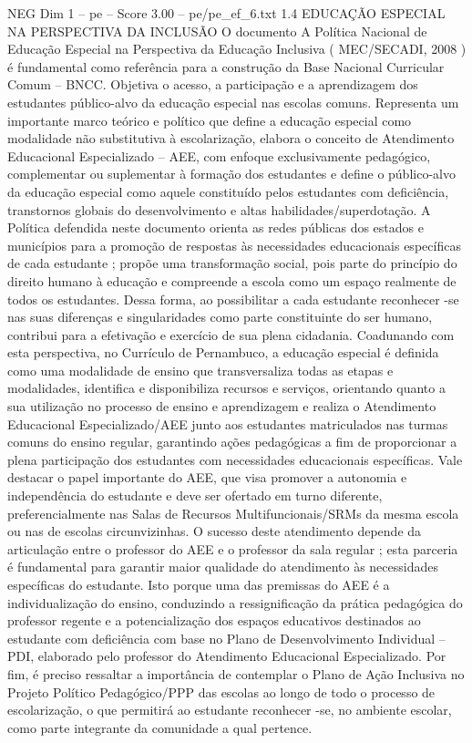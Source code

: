 \begin{textsample}{NEG Dim 1 – pe – Score 3.00 – pe/pe\_ef\_6.txt}  \label{ex:f1_neg_050}
1.4 EDUCAÇÃO ESPECIAL NA PERSPECTIVA DA INCLUSÃO O documento A Política Nacional de Educação Especial na Perspectiva da Educação Inclusiva ( MEC/SECADI, 2008 ) é fundamental como referência para a construção da Base Nacional Curricular Comum – BNCC.
Objetiva o acesso, a participação e a aprendizagem dos estudantes público-alvo da educação especial nas escolas comuns.
Representa um importante marco teórico e político que define a educação especial como modalidade não substitutiva à escolarização, elabora o conceito de Atendimento Educacional Especializado – AEE, com enfoque exclusivamente pedagógico, complementar ou suplementar à formação dos estudantes e define o público-alvo da educação especial como aquele constituído pelos estudantes com deficiência, transtornos globais do desenvolvimento e altas habilidades/superdotação.
A Política defendida neste documento orienta as redes públicas dos estados e municípios para a promoção de respostas às necessidades educacionais específicas de cada estudante ; propõe uma transformação social, pois parte do princípio do direito humano à educação e compreende a escola como um espaço realmente de todos os estudantes.
Dessa forma, ao possibilitar a cada estudante reconhecer -se nas suas diferenças e singularidades como parte constituinte do ser humano, contribui para a efetivação e exercício de sua plena cidadania.
Coadunando com esta perspectiva, no Currículo de Pernambuco, a educação especial é definida como uma modalidade de ensino que transversaliza todas as etapas e modalidades, identifica e disponibiliza recursos e serviços, orientando quanto a sua utilização no processo de ensino e aprendizagem e realiza o Atendimento Educacional Especializado/AEE junto aos estudantes matriculados nas turmas comuns do ensino regular, garantindo ações pedagógicas a fim de proporcionar a plena participação dos estudantes com necessidades educacionais específicas.
Vale destacar o papel importante do AEE, que visa promover a autonomia e independência do estudante e deve ser ofertado em turno diferente, preferencialmente nas Salas de Recursos Multifuncionais/SRMs da mesma escola ou nas de escolas circunvizinhas.
O sucesso deste atendimento depende da articulação entre o professor do AEE e o professor da sala regular ; esta parceria é fundamental para garantir maior qualidade do atendimento às necessidades específicas do estudante.
Isto porque uma das premissas do AEE é a individualização do ensino, conduzindo a ressignificação da prática pedagógica do professor regente e a potencialização dos espaços educativos destinados ao estudante com deficiência com base no Plano de Desenvolvimento Individual – PDI, elaborado pelo professor do Atendimento Educacional Especializado.
Por fim, é preciso ressaltar a importância de contemplar o Plano de Ação Inclusiva no Projeto Político Pedagógico/PPP das escolas ao longo de todo o processo de escolarização, o que permitirá ao estudante reconhecer -se, no ambiente escolar, como parte integrante da comunidade a qual pertence.

\end{textsample}
